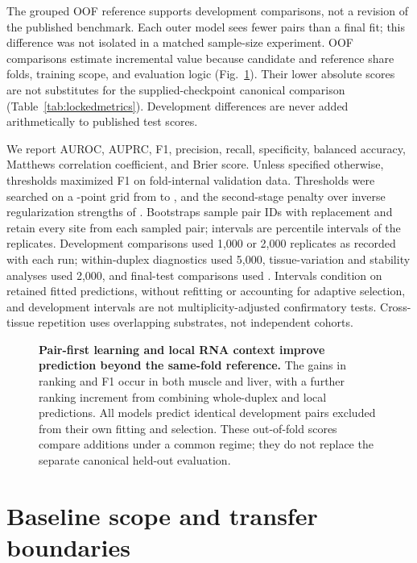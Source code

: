 \documentclass[9pt,twoside]{pnas-new}
\begin{document}
The grouped OOF reference supports development comparisons, not a revision of the published benchmark. Each outer model sees fewer pairs than a final fit; this difference was not isolated in a matched sample-size experiment. OOF comparisons estimate incremental value because candidate and reference share folds, training scope, and evaluation logic (Fig.~\ref{fig:s1}). Their lower absolute scores are not substitutes for the supplied-checkpoint canonical comparison (Table~\ref{tab:lockedmetrics}). Development differences are never added arithmetically to published test scores.

We report AUROC, AUPRC, F1, precision, recall, specificity, balanced accuracy, Matthews correlation coefficient, and Brier score. Unless specified otherwise, thresholds maximized F1 on fold-internal validation data. Thresholds were searched on a \ThresholdGridPoints{}-point grid from \ThresholdGridLow{} to \ThresholdGridHigh{}, and the second-stage penalty over inverse regularization strengths of \PenaltyGrid{}. Bootstraps sample pair IDs with replacement and retain every site from each sampled pair; intervals are percentile intervals of the replicates. Development comparisons used 1,000 or 2,000 replicates as recorded with each run; within-duplex diagnostics used 5,000, tissue-variation and stability analyses used 2,000, and final-test comparisons used \NBootstrapReplicates{}. Intervals condition on retained fitted predictions, without refitting or accounting for adaptive selection, and development intervals are not multiplicity-adjusted confirmatory tests. Cross-tissue repetition uses overlapping substrates, not independent cohorts.

\begin{figure}[H]
\centering

\caption{\textbf{Pair-first learning and local RNA context improve prediction beyond the same-fold reference.} The gains in ranking and F1 occur in both muscle and liver, with a further ranking increment from combining whole-duplex and local predictions. All models predict identical development pairs excluded from their own fitting and selection. These out-of-fold scores compare additions under a common regime; they do not replace the separate canonical held-out evaluation.}
\label{fig:s1}
\end{figure}



\section{Baseline scope and transfer boundaries}\label{si:scope}
\end{document}
